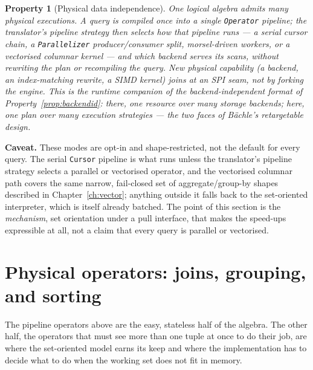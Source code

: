 \documentclass[11pt,a4paper,oneside]{report}
\theoremstyle{sirixthm}
\newtheorem{property}{Property}[chapter]
\newcommand{\code}[1]{\texttt{#1}}
\begin{document}
\begin{property}[Physical data independence]\label{prop:pdi}
One logical algebra admits many physical executions. A query is compiled once into a single
\code{Operator} pipeline; the translator's pipeline strategy then selects \emph{how} that pipeline runs ---
a serial cursor chain, a \code{Parallelizer} producer/consumer split, morsel-driven workers, or a
vectorised columnar kernel --- and which backend serves its scans, without rewriting the plan or
recompiling the query. New physical capability (a backend, an index-matching rewrite, a SIMD kernel) joins
at an SPI seam, not by forking the engine. This is the runtime companion of the backend-independent
\emph{format} of Property~\ref{prop:backendid}: there, one resource over many storage backends; here, one
plan over many execution strategies --- the two faces of B\"achle's \emph{retargetable} design.
\end{property}

\begin{honesty}
\small\textbf{Caveat.} These modes are opt-in and shape-restricted, not the default for every query. The
serial \code{Cursor} pipeline is what runs unless the translator's pipeline strategy selects a parallel
or vectorised operator, and the vectorised columnar path covers the same narrow, fail-closed set of
aggregate/group-by shapes described in Chapter~\ref{ch:vector}; anything outside it falls back to the
set-oriented interpreter, which is itself already batched. The point of this section is the
\emph{mechanism}, set orientation under a pull interface, that makes the speed-ups expressible at all,
not a claim that every query is parallel or vectorised.
\end{honesty}

\section{Physical operators: joins, grouping, and sorting}
\label{sec:physops}

The pipeline operators above are the easy, stateless half of the algebra. The other half, the operators
that must see more than one tuple at once to do their job, are where the set-oriented model earns its
keep and where the implementation has to decide what to do when the working set does not fit in memory.
\end{document}
